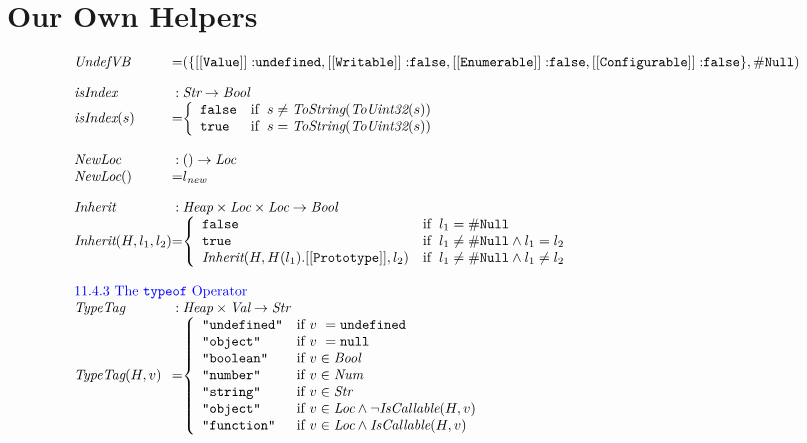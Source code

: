 \section{Our Own Helpers}
\[
\begin{array}{l@{}c@{}l}
\UndefVB &=& (\{{\tt [[Value]]:} \undef,
{\tt [[Writable]]:} \false,
{\tt [[Enumerable]]:} \false,
{\tt [[Configurable]]:} \false\}, \nullL)
\\[1em]
\hf{isIndex} & : & \Str \rightarrow \Bool \\
\hf{isIndex}(s) &=&
\left\{\begin{array}{ll}
\false& \ifc{s \not= \hf{ToString}(\hf{ToUint32}(s))}\\
\true& \ifc{s = \hf{ToString}(\hf{ToUint32}(s))}\\
\end{array}\right.
\\\\

\hf{NewLoc} & :& () \rightarrow \Loc \\
\hf{NewLoc}() &=& l_{\emph{new}}
\\[1em]
\hf{Inherit}&:& \Heap \times \Loc \times \Loc \rightarrow \Bool \\
\hf{Inherit}(H, l_1, l_2) &=&
\left\{\begin{array}{ll}
\false& \ifc{l_1 = \nullL}\\
\true& \ifc{l_1 \not= \nullL\wedge l_1 = l_2}\\
\hf{Inherit}(H,H(l_1).{\tt [[Prototype]]},l_2) & \ifc{l_1 \not= \nullL\wedge l_1 \not= l_2}\\
\end{array}\right.
\\\\

\multicolumn{3}{l}{\mbox{\inblue 11.4.3 The {\tt typeof} Operator}}\\
\hf{TypeTag} & :& \Heap \times \Val \rightarrow \Str \\
\hf{TypeTag}(H,v) &=&
\left\{ \begin{array}{ll}
\verb+"undefined"+ &\mbox{if $v\ = \undef$}\\
\verb+"object"+ &\mbox{if $v\ = \nullK$}\\
\verb+"boolean"+&\mbox{if $v\in\Bool$}\\
\verb+"number"+ &\mbox{if $v\in\Num$}\\
\verb+"string"+ &\mbox{if $v\in\Str$}\\
\verb+"object"+ &\mbox{if $v\in\Loc\wedge\neg\hf{IsCallable}(H,v)$}\\
\verb+"function"+ &\mbox{if $v\in\Loc\wedge\hf{IsCallable}(H,v)$}\\
\end{array}
\right.
\\[1em]


\end{array}\]
